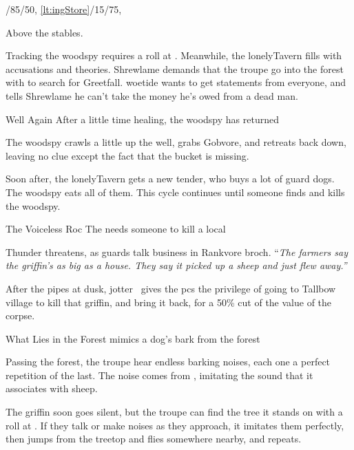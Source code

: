 \documentclass[10pt,twoside]{book}
\begin{document}
\setcounter{wounds}{3}
\woodspy
\setcounter{wounds}{0}

%
  {%
    /85/50,%
    \ref{lt:ingStore}/15/75,
  }%
  {Above the stables.\par}

Tracking the \gls{woodspy} requires a  roll at \tn[10].
Meanwhile, the \gls{lonelyTavern} fills with accusations and theories.
Shrewlame demands that the troupe go into the forest with  to search for Greetfall.
\Gls{woetide} wants to get statements from everyone, and tells Shrewlame he can't take the money he's owed from a dead man.

{Well Again}%
{After a little time healing, the \gls{woodspy} has returned}%

The \gls{woodspy} crawls a little up the well, grabs Gobvore, and retreats back down, leaving no clue except the fact that the bucket is missing.

Soon after, the \gls{lonelyTavern} gets a new \gls{tender}, who buys a lot of guard dogs.
The \gls{woodspy} eats all of them.
This cycle continues until someone finds and kills the \gls{woodspy}.


{The Voiceless Roc}%
{The  needs someone to kill a local }%

Thunder threatens, as \glspl{guard} talk business in Rankvore \gls{broch}.
``\textit{The farmers say the \gls{griffin}'s as big as a house.
They say it picked up a sheep and just flew away.''}

After the pipes at dusk, \gls{jotter} \composeHumanName\ gives the \glspl{pc} the privilege of going to Tallbow \gls{village} to kill that \gls{griffin}, and bring it back, for a 50\% cut of the value of the corpse.

{What Lies in the Forest}%
{ mimics a dog's bark from the forest}%

Passing the forest, the troupe hear endless barking noises, each one a perfect repetition of the last.
The noise comes from , imitating the sound that it associates with sheep.

The \gls{griffin} soon goes silent, but the troupe can find the tree it stands on with a  roll at \tn[8].
If they talk or make noises as they approach, it imitates them perfectly, then jumps from the treetop and flies somewhere nearby, and repeats.
\end{document}
